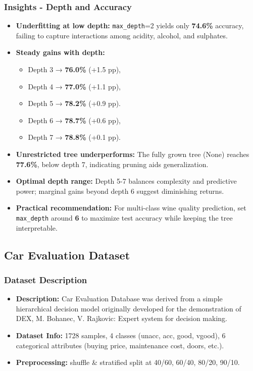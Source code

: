 \subsubsection*{Insights - Depth and Accuracy}
\begin{itemize}
	\item \textbf{Underfitting at low depth:}
	      \texttt{max\_depth}=2 yields only \textbf{74.6\%} accuracy, failing to capture interactions among acidity, alcohol, and sulphates.
	\item \textbf{Steady gains with depth:}
	      \begin{itemize}
		      \item Depth 3 → \textbf{76.0\%} (+1.5 pp),
		      \item Depth 4 → \textbf{77.0\%} (+1.1 pp),
		      \item Depth 5 → \textbf{78.2\%} (+0.9 pp).
		      \item Depth 6 → \textbf{78.7\%} (+0.6 pp),
		      \item Depth 7 → \textbf{78.8\%} (+0.1 pp).
	      \end{itemize}
	\item \textbf{Unrestricted tree underperforms:}
	      The fully grown tree (None) reaches \textbf{77.6\%}, below depth 7, indicating pruning aids generalization.
	\item \textbf{Optimal depth range:}
	      Depth 5-7 balances complexity and predictive power; marginal gains beyond depth 6 suggest diminishing returns.
	\item \textbf{Practical recommendation:}
	      For multi-class wine quality prediction, set \texttt{max\_depth} around \textbf{6} to maximize test accuracy while keeping the tree interpretable.
\end{itemize}


\clearpage
\subsection{Car Evaluation Dataset}
\subsubsection*{Dataset Description}
\begin{itemize}
	\item \textbf{Description:} Car Evaluation Database was derived from a simple hierarchical decision model originally developed for the demonstration of DEX, M. Bohanec, V. Rajkovic: Expert system for decision making.
	\item \textbf{Dataset Info:} 1728 samples, 4 classes (unacc, acc, good, vgood), 6 categorical attributes (buying price, maintenance cost, doors, etc.).
	\item \textbf{Preprocessing:} shuffle \& stratified split at 40/60, 60/40, 80/20, 90/10.
\end{itemize}

